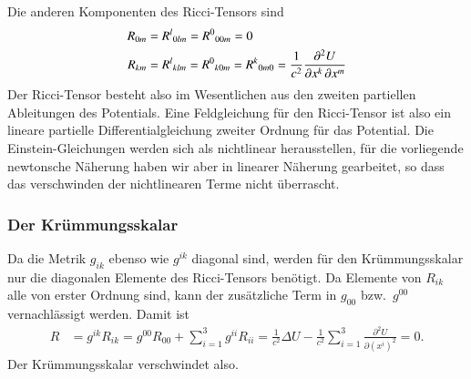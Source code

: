 Die anderen Komponenten des Ricci-Tensors sind
\begin{align*}
R_{0m}
&=
R^l\mathstrut_{0lm}
=
R^0\mathstrut_{00m}
=
0
\\
R_{km}
&=
R^l\mathstrut_{klm}
=
R^0\mathstrut_{k0m}
=
R^k\mathstrut_{0m0}
=
\frac{1}{c^2}
\frac{\partial^2 U}{\partial x^k\,\partial x^m}
\end{align*}
Der Ricci-Tensor besteht also im Wesentlichen aus den zweiten
partiellen Ableitungen des Potentials.
Eine Feldgleichung für den Ricci-Tensor ist also ein lineare
partielle Differentialgleichung zweiter Ordnung für das Potential.
Die Einstein-Gleichungen werden sich als nichtlinear herausstellen,
für die vorliegende newtonsche Näherung haben wir aber in linearer
Näherung gearbeitet, so dass das verschwinden der nichtlinearen
Terme nicht überrascht.

\subsubsection{Der Krümmungsskalar}
Da die Metrik $g_{ik}$ ebenso wie $g^{ik}$ diagonal sind, werden
für den Krümmungsskalar nur die diagonalen Elemente des Ricci-Tensors
benötigt.
Da Elemente von $R_{ik}$ alle von erster Ordnung sind, kann der
zusätzliche Term in $g_{00}$ bzw.~$g^{00}$ vernachlässigt werden.
Damit ist 
\begin{align*}
R
&=
g^{ik}R_{ik}
=
g^{00}R_{00}
+
\sum_{i=1}^3
g^{ii}R_{ii}
=
\frac{1}{c^2}\Delta U
-
\frac{1}{c^2}
\sum_{i=1}^3
\frac{\partial^2 U}{\partial (x^i)^2}
=
0.
\end{align*}
Der Krümmungsskalar verschwindet also.
